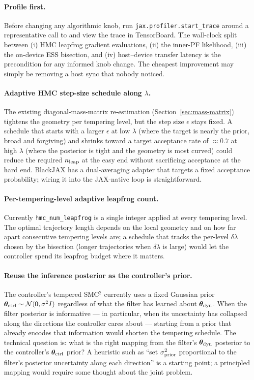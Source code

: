 \paragraph{Profile first.} Before changing any algorithmic knob, run
\texttt{jax.profiler.start\_trace} around a representative call to
 and view the trace in
TensorBoard. The wall-clock split between (i) HMC leapfrog gradient
evaluations, (ii) the inner-PF likelihood, (iii) the on-device ESS
bisection, and (iv) host--device transfer latency is the precondition
for any informed knob change. The cheapest improvement may simply be
removing a host sync that nobody noticed.

\paragraph{Adaptive HMC step-size schedule along $\lambda$.} The
existing diagonal-mass-matrix re-estimation
(Section~\ref{sec:mass-matrix}) tightens the geometry per tempering
level, but the step size $\epsilon$ stays fixed. A schedule that
starts with a larger $\epsilon$ at low $\lambda$ (where the target is
nearly the prior, broad and forgiving) and shrinks toward a target
acceptance rate of $\approx 0.7$ at high $\lambda$ (where the
posterior is tight and the geometry is most curved) could reduce the
required $n_{\rm leap}$ at the easy end without sacrificing
acceptance at the hard end. BlackJAX has a dual-averaging adapter
that targets a fixed acceptance probability; wiring it into the
JAX-native loop is straightforward.

\paragraph{Per-tempering-level adaptive leapfrog count.} Currently
\texttt{hmc\_num\_leapfrog} is a single integer applied at every
tempering level. The optimal trajectory length depends on the local
geometry and on how far apart consecutive tempering levels are; a
schedule that tracks the per-level $\delta\lambda$ chosen by the
bisection (longer trajectories when $\delta\lambda$ is large) would
let the controller spend its leapfrog budget where it matters.

\paragraph{Reuse the inference posterior as the controller's prior.}
The controller's tempered SMC$^2$ currently uses a fixed Gaussian
prior $\bm{\theta}_{\rm ctrl} \sim \mathcal{N}(0, \sigma^2 I)$ regardless of what the
filter has learned about $\bm{\theta}_{\rm dyn}$. When the filter posterior is
informative --- in particular, when its uncertainty has collapsed
along the directions the controller cares about --- starting from a
prior that already encodes that information would shorten the
tempering schedule. The technical question is: what is the right
mapping from the filter's $\bm{\theta}_{\rm dyn}$ posterior to the controller's
$\bm{\theta}_{\rm ctrl}$ prior? A heuristic such as ``set
$\sigma_{\rm prior}^2$ proportional to the filter's posterior
uncertainty along each direction'' is a starting point; a principled
mapping would require some thought about the joint problem.

